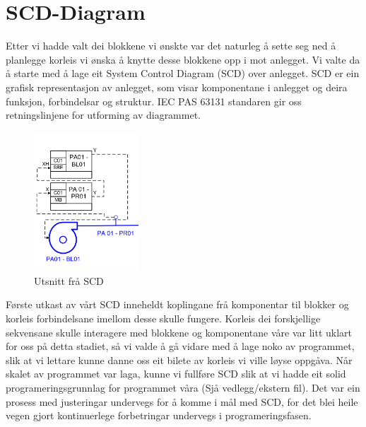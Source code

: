 \section{SCD-Diagram}
\thispagestyle{fancy}

Etter vi hadde valt dei blokkene vi ønskte var det naturleg å sette seg ned å planlegge korleis vi ønska å knytte desse blokkene opp i mot anlegget. 
Vi valte da å starte med å lage eit System Control Diagram (SCD) over anlegget. 
SCD er ein grafisk representasjon av anlegget, som visar komponentane i anlegget og deira funksjon, forbindelsar og struktur. 
IEC PAS 63131 standaren gir oss retningslinjene for utforming av diagrammet.


\begin{figure}[htbp]
    \centering
    \includegraphics[width=0.35\textwidth]{Bilder/Visio_eksempel.png}
    \caption{Utsnitt frå SCD}\label{fig:SCD eksempel}    
\end{figure}


Første utkast av vårt SCD inneheldt koplingane frå komponentar til blokker og korleis forbindelsane imellom desse skulle fungere. 
Korleis dei forskjellige sekvensane skulle interagere med blokkene og komponentane våre var litt uklart for oss på detta stadiet,
så vi valde å gå vidare med å lage noko av programmet, slik at vi lettare kunne danne oss eit bilete av korleis vi ville løyse oppgåva.
Når skalet av programmet var laga, kunne vi fullføre SCD slik at vi hadde eit solid programeringsgrunnlag for programmet våra (Sjå vedlegg/ekstern fil). 
Det var ein prosess med justeringar undervegs for å komme i mål med SCD, for det blei heile vegen gjort kontinuerlege forbetringar undervegs i programeringsfasen.